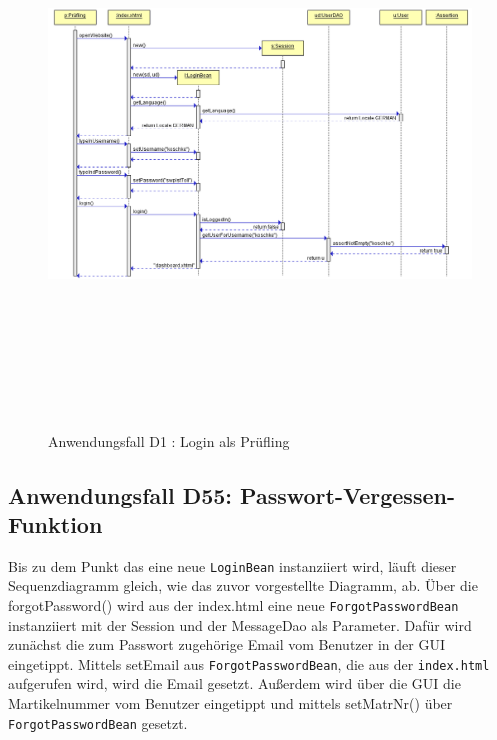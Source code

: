 \begin{figure}[H]
	\centering
	\includegraphics[width=\textwidth,height=15cm,keepaspectratio]{../UMLDiagramme/d1_login}
	\caption{Anwendungsfall D1 : Login als Prüfling}
	\label{fig1}
\end{figure}



\subsection{Anwendungsfall D55: Passwort-Vergessen-Funktion}
Bis zu dem Punkt das eine neue \texttt {LoginBean} instanziiert wird, läuft dieser Sequenzdiagramm gleich, wie das zuvor vorgestellte Diagramm, ab.
Über die  forgotPassword() wird aus der index.html eine neue \texttt {ForgotPasswordBean} instanziiert mit der Session und der MessageDao als Parameter. Dafür wird zunächst die zum Passwort zugehörige Email vom Benutzer in der GUI eingetippt. Mittels setEmail aus \texttt {ForgotPasswordBean}, die aus der \texttt {index.html}  aufgerufen wird, wird die Email gesetzt.
Außerdem wird über die GUI die Martikelnummer vom Benutzer eingetippt und mittels setMatrNr() über \texttt {ForgotPasswordBean} gesetzt.

